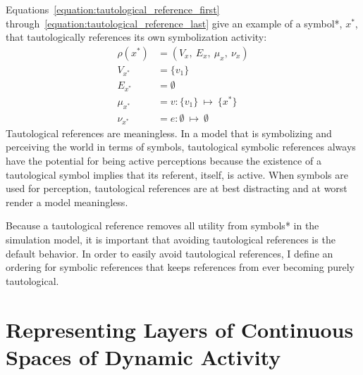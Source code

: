 {\mbox{Equations~\ref{equation:tautological_reference_first}}}
{\mbox{through~\ref{equation:tautological_reference_last}}} give an
example of a symbol*, $x^*$, that tautologically references its own
symbolization activity:
\begin{align}
\label{equation:tautological_reference_first}
\rho(x^*) &= (V_x, ~E_x, ~\mu_x, ~\nu_x) \\
 V_{x^*}   &= \{v_1\} \\
 E_{x^*}   &= \emptyset \\
 \mu_{x^*} &= v : \{v_1\} ~{\mapsto}~ \{x^*\} \\
\label{equation:tautological_reference_last}
            \nu_{x^*} &= e : \emptyset ~{\mapsto}~ \emptyset
\end{align}
Tautological references are meaningless.  In a model that is
symbolizing and perceiving the world in terms of symbols, tautological
symbolic references always have the potential for being active
perceptions because the existence of a tautological symbol implies
that its referent, itself, is active.  When symbols are used for
perception, tautological references are at best distracting and at
worst render a model meaningless.

Because a tautological reference removes all utility from symbols* in
the simulation model, it is important that avoiding tautological
references is the default behavior.  In order to easily avoid
tautological references, I define an ordering for symbolic references
that keeps references from ever becoming purely tautological.

\section{Representing Layers of Continuous Spaces of Dynamic Activity}

